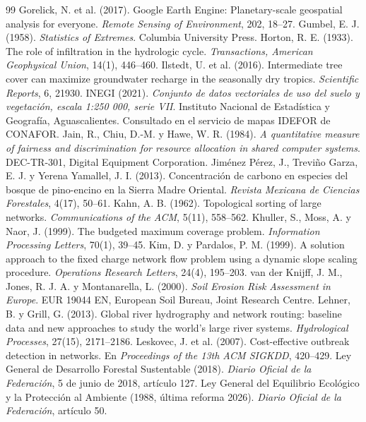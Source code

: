\documentclass[11pt,letterpaper]{article}
\begin{document}
\begin{thebibliography}{99}
 Gorelick, N. et al. (2017). Google Earth Engine: Planetary-scale geospatial analysis for everyone. \emph{Remote Sensing of Environment}, 202, 18–27.
 Gumbel, E. J. (1958). \emph{Statistics of Extremes}. Columbia University Press.
 Horton, R. E. (1933). The role of infiltration in the hydrologic cycle. \emph{Transactions, American Geophysical Union}, 14(1), 446–460.
 Ilstedt, U. et al. (2016). Intermediate tree cover can maximize groundwater recharge in the seasonally dry tropics. \emph{Scientific Reports}, 6, 21930.
 INEGI (2021). \emph{Conjunto de datos vectoriales de uso del suelo y vegetación, escala 1:250 000, serie VII}. Instituto Nacional de Estadística y Geografía, Aguascalientes. Consultado en el servicio de mapas IDEFOR de CONAFOR.
 Jain, R., Chiu, D.-M. y Hawe, W. R. (1984). \emph{A quantitative measure of fairness and discrimination for resource allocation in shared computer systems}. DEC-TR-301, Digital Equipment Corporation.
 Jiménez Pérez, J., Treviño Garza, E. J. y Yerena Yamallel, J. I. (2013). Concentración de carbono en especies del bosque de pino-encino en la Sierra Madre Oriental. \emph{Revista Mexicana de Ciencias Forestales}, 4(17), 50–61.
 Kahn, A. B. (1962). Topological sorting of large networks. \emph{Communications of the ACM}, 5(11), 558–562.
 Khuller, S., Moss, A. y Naor, J. (1999). The budgeted maximum coverage problem. \emph{Information Processing Letters}, 70(1), 39–45.
 Kim, D. y Pardalos, P. M. (1999). A solution approach to the fixed charge network flow problem using a dynamic slope scaling procedure. \emph{Operations Research Letters}, 24(4), 195–203.
 van der Knijff, J. M., Jones, R. J. A. y Montanarella, L. (2000). \emph{Soil Erosion Risk Assessment in Europe}. EUR 19044 EN, European Soil Bureau, Joint Research Centre.
 Lehner, B. y Grill, G. (2013). Global river hydrography and network routing: baseline data and new approaches to study the world's large river systems. \emph{Hydrological Processes}, 27(15), 2171–2186.
 Leskovec, J. et al. (2007). Cost-effective outbreak detection in networks. En \emph{Proceedings of the 13th ACM SIGKDD}, 420–429.
 Ley General de Desarrollo Forestal Sustentable (2018). \emph{Diario Oficial de la Federación}, 5 de junio de 2018, artículo 127.
 Ley General del Equilibrio Ecológico y la Protección al Ambiente (1988, última reforma 2026). \emph{Diario Oficial de la Federación}, artículo 50.

\end{thebibliography}
\end{document}
